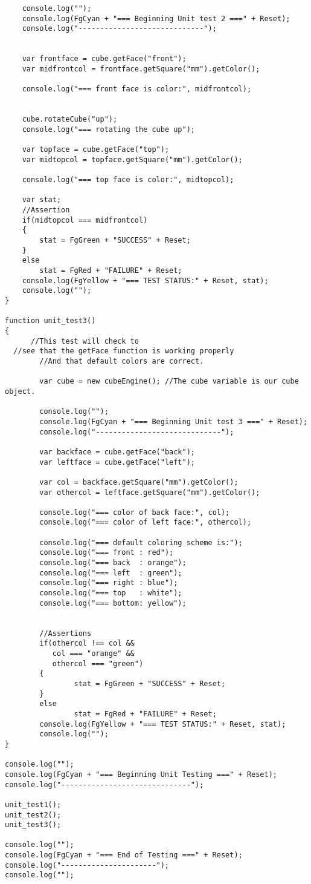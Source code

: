 \documentclass[12pt]{article}
\begin{document}
\begin{verbatim}
	console.log("");	
	console.log(FgCyan + "=== Beginning Unit test 2 ===" + Reset);
	console.log("-----------------------------");


	var frontface = cube.getFace("front");
	var midfrontcol = frontface.getSquare("mm").getColor();

	console.log("=== front face is color:", midfrontcol);
	

	cube.rotateCube("up");
	console.log("=== rotating the cube up");
	
	var topface = cube.getFace("top");
	var midtopcol = topface.getSquare("mm").getColor();
	
	console.log("=== top face is color:", midtopcol);

	var stat;
	//Assertion
	if(midtopcol === midfrontcol)
	{
		stat = FgGreen + "SUCCESS" + Reset;
	}
	else
		stat = FgRed + "FAILURE" + Reset;
	console.log(FgYellow + "=== TEST STATUS:" + Reset, stat);
	console.log("");
}

function unit_test3()
{
	  //This test will check to 
  //see that the getFace function is working properly
        //And that default colors are correct.
  
        var cube = new cubeEngine(); //The cube variable is our cube object.

        console.log("");
        console.log(FgCyan + "=== Beginning Unit test 3 ===" + Reset);
        console.log("-----------------------------");

        var backface = cube.getFace("back");
        var leftface = cube.getFace("left");

        var col = backface.getSquare("mm").getColor();
        var othercol = leftface.getSquare("mm").getColor();

        console.log("=== color of back face:", col);
        console.log("=== color of left face:", othercol);

        console.log("=== default coloring scheme is:");
        console.log("=== front : red");
        console.log("=== back  : orange");
        console.log("=== left  : green");
        console.log("=== right : blue");
        console.log("=== top   : white");
        console.log("=== bottom: yellow");


        //Assertions
        if(othercol !== col &&
           col === "orange" &&
           othercol === "green")
        {
                stat = FgGreen + "SUCCESS" + Reset;
        }
        else
                stat = FgRed + "FAILURE" + Reset;
        console.log(FgYellow + "=== TEST STATUS:" + Reset, stat);
        console.log("");
}

console.log("");
console.log(FgCyan + "=== Beginning Unit Testing ===" + Reset);
console.log("------------------------------");

unit_test1();
unit_test2();
unit_test3();

console.log("");
console.log(FgCyan + "=== End of Testing ===" + Reset);
console.log("----------------------");
console.log("");

\end{verbatim}
\end{document}
